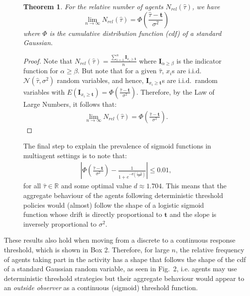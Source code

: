 \documentclass{nature}
\newtheorem{theorem}{Theorem}
\def\R{\mathbb{R}}    %
\def\td{\mathbf{t}}   %
\begin{document}
\nolinenumbers
\begin{figure}
\begin{framed}
\begin{theorem}\label{thrm:relativefrequency}
For the relative number of agents $N_{rel}(\hat{\tau})$, we have
\begin{equation}
\lim_{n\to\infty}N_{rel}(\hat{\tau})=\Phi(\frac{\hat{\tau}-\td}{\sigma^2})
\end{equation}
where $\Phi$ is the cumulative distribution function (cdf) of a standard Gaussian. 
\end{theorem}
\begin{proof}
Note that $N_{rel}(\hat{\tau})=\frac{\sum_{i=1}^n\mathbf{I}_{x_i\geq \td}}{n}$ where $\mathbf{I}_{\alpha\geq \beta}$ is the indicator function for $\alpha\geq \beta$. But note that for a given $\hat{\tau}$, $x_i$s are i.i.d.\ $\mathcal{N}(\hat{\tau},\sigma^2)$ random variables, and hence, $\mathbf{I}_{x_i\geq \td}$s are i.i.d.\ random variables with $E(\mathbf{I}_{x_i\geq \td})=\Phi(\frac{\hat{\tau}-\td}{\sigma^2})$. Therefore, by the Law of Large Numbers, it follows that:
\vspace{-5px}
\begin{align*}
\lim_{n\to\infty}N_{rel}(\hat{\tau})=\Phi(\frac{\hat{\tau}-\td}{\sigma^2}).
\end{align*}
\vspace{-35px}
\end{proof}
\vspace{-30px}
The final step to explain the prevalence of sigmoid functions in multiagent settings is to note that:
\begin{align*}
|\Phi(\frac{\hat{\tau}-\td}{\sigma^2})-\frac{1}{1+e^{-d(\frac{\hat{\tau}-\td}{\sigma^2})}}|\leq 0.01,
\end{align*}
for all $\hat{\tau}\in\R$ and some optimal value $d\approx 1.704$\cite{Camilli1994}. This means that the aggregate behaviour of the agents following deterministic threshold policies would (almost) follow the shape of a logistic sigmoid function whose drift is directly proportional to $\td$ and the slope  is inversely proportional to $\sigma^2$. 
\end{framed}
\end{figure}

\linenumbers
These results also hold when moving from a discrete to a continuous response threshold, which is shown in Box 2. Therefore, for large $n$, the relative frequency of agents taking part in the activity has a shape that follows the shape of the cdf of a standard Gaussian random variable, as seen in Fig.~2, i.e. agents may use deterministic threshold strategies but their aggregate behaviour would appear to an \textit{outside observer} as a continuous (sigmoid) threshold function.
\end{document}
